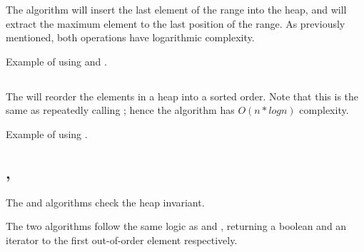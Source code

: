 The  algorithm will insert the last element of the range into the heap, and  will extract the maximum element to the last position of the range. As previously mentioned, both operations have logarithmic complexity.

\begin{box-note}
\footnotesize Example of using  and .
\tcblower
{}
\end{box-note}

\subsection{\texorpdfstring{}{\texttt{std::sort\_heap}}}

The  will reorder the elements in a heap into a sorted order. Note that this is the same as repeatedly calling ; hence the algorithm has $O(n*logn)$ complexity.


\begin{box-note}
\footnotesize Example of using .
\tcblower
{}
\end{box-note}

\subsection{\texorpdfstring{, }{\texttt{std::is\_heap}, \texttt{std::is\_heap\_until}}}

The  and  algorithms check the heap invariant.



The two algorithms follow the same logic as  and , returning a boolean and an iterator to the first out-of-order element respectively.

